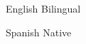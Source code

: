 
\begin{cvskills}

  \cvskill
    {English} %
    {Bilingual} %

  \cvskill
    {Spanish} %
    {Native} %
    
\end{cvskills}
